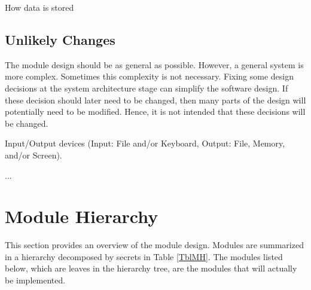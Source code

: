 \documentclass[12pt, titlepage]{article}
\newcounter{acnum}
\newcommand{\actheacnum}{AC\theacnum}
\newcounter{ucnum}
\newcommand{\uctheucnum}{UC\theucnum}
\begin{document}
\begin{description}
		
		
		\item[\refstepcounter{acnum} \actheacnum \label{ac51}:]  How data is stored
	\end{description}
	
	\subsection{Unlikely Changes} \label{SecUchange}
	
	The module design should be as general as possible. However, a general system is
	more complex. Sometimes this complexity is not necessary. Fixing some design
	decisions at the system architecture stage can simplify the software design. If
	these decision should later need to be changed, then many parts of the design
	will potentially need to be modified. Hence, it is not intended that these
	decisions will be changed.
	
	\begin{description}
		\item[ \uctheucnum \label{ucIO}:] Input/Output devices
		(Input: File and/or Keyboard, Output: File, Memory, and/or Screen).
		\item ...
	\end{description}
	
	\section{Module Hierarchy} \label{SecMH}
	
	This section provides an overview of the module design. Modules are summarized
	in a hierarchy decomposed by secrets in Table \ref{TblMH}. The modules listed
	below, which are leaves in the hierarchy tree, are the modules that will
	actually be implemented.
	
	
	
\end{document}
